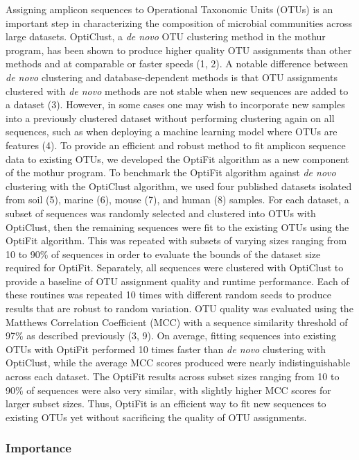 \documentclass[
  12pt,
]{article}
\begin{document}
Assigning amplicon sequences to Operational Taxonomic Units (OTUs) is an
important step in characterizing the composition of microbial
communities across large datasets. OptiClust, a \emph{de novo} OTU
clustering method in the mothur program, has been shown to produce
higher quality OTU assignments than other methods and at comparable or
faster speeds (1, 2). A notable difference between \emph{de novo}
clustering and database-dependent methods is that OTU assignments
clustered with \emph{de novo} methods are not stable when new sequences
are added to a dataset (3). However, in some cases one may wish to
incorporate new samples into a previously clustered dataset without
performing clustering again on all sequences, such as when deploying a
machine learning model where OTUs are features (4). To provide an
efficient and robust method to fit amplicon sequence data to existing
OTUs, we developed the OptiFit algorithm as a new component of the
mothur program. To benchmark the OptiFit algorithm against \emph{de
novo} clustering with the OptiClust algorithm, we used four published
datasets isolated from soil (5), marine (6), mouse (7), and human (8)
samples. For each dataset, a subset of sequences was randomly selected
and clustered into OTUs with OptiClust, then the remaining sequences
were fit to the existing OTUs using the OptiFit algorithm. This was
repeated with subsets of varying sizes ranging from 10 to 90\% of
sequences in order to evaluate the bounds of the dataset size required
for OptiFit. Separately, all sequences were clustered with OptiClust to
provide a baseline of OTU assignment quality and runtime performance.
Each of these routines was repeated 10 times with different random seeds
to produce results that are robust to random variation. OTU quality was
evaluated using the Matthews Correlation Coefficient (MCC) with a
sequence similarity threshold of 97\% as described previously (3, 9). On
average, fitting sequences into existing OTUs with OptiFit performed 10
times faster than \emph{de novo} clustering with OptiClust, while the
average MCC scores produced were nearly indistinguishable across each
dataset. The OptiFit results across subset sizes ranging from 10 to 90\%
of sequences were also very similar, with slightly higher MCC scores for
larger subset sizes. Thus, OptiFit is an efficient way to fit new
sequences to existing OTUs yet without sacrificing the quality of OTU
assignments.

\hypertarget{importance}{%
\subsubsection{Importance}\label{importance}}
\end{document}
